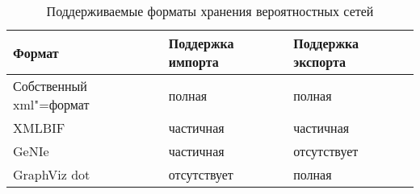 \begin{table}[ht]
\caption{Поддерживаемые форматы хранения вероятностных сетей}
\label{table:arch_and_mod:net_persistence:supported_formats}
\centering
  \begin{tabular}{| >{\raggedright}m{} 
                  | >{\centering}m{} 
                  | >{\centering\arraybackslash}m{}|}
  \hline Формат & Поддержка импорта & Поддержка экспорта \\
  \hline Собственный xml"=формат & полная & полная \\
  \hline XMLBIF & частичная & частичная \\
  \hline GeNIe & частичная & отсутствует \\
  \hline GraphViz dot & отсутствует & полная \\
  \hline
  \end{tabular}
\end{table}
